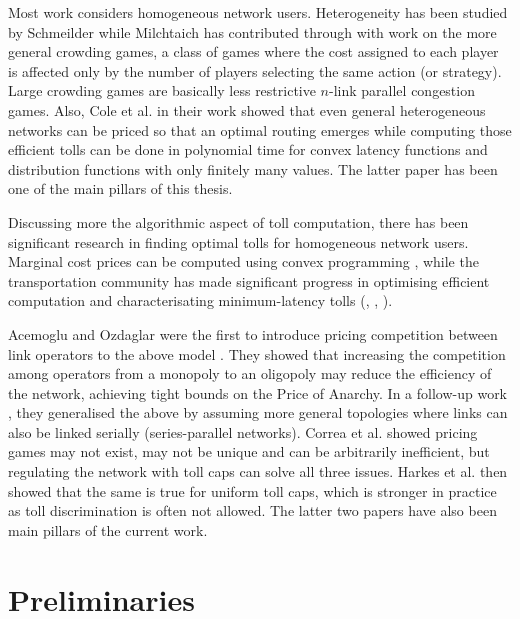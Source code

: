 \documentclass[10pt,a4paper]{book}
\theoremstyle{definition}
\theoremstyle{comment}
\begin{document}
Most work considers homogeneous network users.
Heterogeneity has been studied by Schmeilder \cite{1973JSP.....7..295S} while Milchtaich \cite[Prop $3.3$]{doi:10.1287/moor.25.3.349.12220} has contributed through with work on the more general crowding games, a class of games where the cost assigned to each player is affected only by the number of players selecting the same action (or strategy).
Large crowding games are basically less restrictive $n$-link parallel congestion games.
Also, Cole et al. \cite{10.1145/780542.780618} in their work showed that even general heterogeneous networks can be priced so that an optimal routing emerges while computing those efficient tolls can be done in polynomial time for convex latency functions and distribution functions with only finitely many values.
The latter paper has been one of the main pillars of this thesis.

Discussing more the algorithmic aspect of toll computation, there has been significant research in finding optimal tolls for homogeneous network users.
Marginal cost prices can be computed using convex programming \cite{beckmann1956studies}, while the transportation community has made significant progress in optimising efficient computation and characterisating minimum-latency tolls (\cite{10.1007/978-3-642-59179-2_4}, \cite{Hearn1998}, \cite{Hearn2002}).

Acemoglu and Ozdaglar were the first to introduce pricing competition between link operators to the above model \cite{10.1287/moor.1060.0231}.
They showed that increasing the competition among operators from a monopoly to an oligopoly may reduce the efficiency of the network, achieving tight bounds on the Price of Anarchy.
In a follow-up work \cite{10.1109/JSAC.2007.070812}, they generalised the above by assuming more general topologies where links can also be linked serially (series-parallel networks).
Correa et al. \cite{correa2018pricing} showed pricing games may not exist, may not be unique and can be arbitrarily inefficient, but regulating the network with toll caps can solve all three issues.
Harkes et al. \cite{Harks_2019} then showed that the same is true for uniform toll caps, which is stronger in practice as toll discrimination is often not allowed.
The latter two papers have also been main pillars of the current work.


\cleardoublepage


\chapter{Preliminaries}
\label{chapter:preliminaries}
\end{document}
